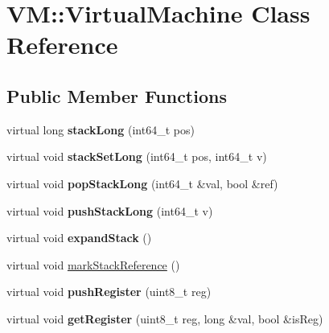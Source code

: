\hypertarget{class_v_m_1_1_virtual_machine}{\section{V\-M\-:\-:Virtual\-Machine Class Reference}
\label{class_v_m_1_1_virtual_machine}
}
\subsection*{Public Member Functions}
\begin{DoxyCompactItemize}
\item 
\hypertarget{class_v_m_1_1_virtual_machine_a921410c92816e435c186ca5298b72bdd}{virtual long {\bfseries stack\-Long} (int64\-\_\-t pos)}\label{class_v_m_1_1_virtual_machine_a921410c92816e435c186ca5298b72bdd}

\item 
\hypertarget{class_v_m_1_1_virtual_machine_a59e82138e4b6ffcaa63ba24948e463fb}{virtual void {\bfseries stack\-Set\-Long} (int64\-\_\-t pos, int64\-\_\-t v)}\label{class_v_m_1_1_virtual_machine_a59e82138e4b6ffcaa63ba24948e463fb}

\item 
\hypertarget{class_v_m_1_1_virtual_machine_a894cb6bba41d689f7efe9d96b1169348}{virtual void {\bfseries pop\-Stack\-Long} (int64\-\_\-t \&val, bool \&ref)}\label{class_v_m_1_1_virtual_machine_a894cb6bba41d689f7efe9d96b1169348}

\item 
\hypertarget{class_v_m_1_1_virtual_machine_a2e71b42c4b71774c38c068fac038ce86}{virtual void {\bfseries push\-Stack\-Long} (int64\-\_\-t v)}\label{class_v_m_1_1_virtual_machine_a2e71b42c4b71774c38c068fac038ce86}

\item 
\hypertarget{class_v_m_1_1_virtual_machine_a823add4bb2eb056811ab17cdae1840e5}{virtual void {\bfseries expand\-Stack} ()}\label{class_v_m_1_1_virtual_machine_a823add4bb2eb056811ab17cdae1840e5}

\item 
virtual void \hyperlink{class_v_m_1_1_virtual_machine_a16e26b2033eb8a2689a29759aa864c7a}{mark\-Stack\-Reference} ()
\item 
\hypertarget{class_v_m_1_1_virtual_machine_a5bf3b52879bae8c9199733031840a74d}{virtual void {\bfseries push\-Register} (uint8\-\_\-t reg)}\label{class_v_m_1_1_virtual_machine_a5bf3b52879bae8c9199733031840a74d}

\item 
\hypertarget{class_v_m_1_1_virtual_machine_a3a756619c328ac943a982bdfc6a31aeb}{virtual void {\bfseries get\-Register} (uint8\-\_\-t reg, long \&val, bool \&is\-Reg)}\label{class_v_m_1_1_virtual_machine_a3a756619c328ac943a982bdfc6a31aeb}


\end{DoxyCompactItemize}
